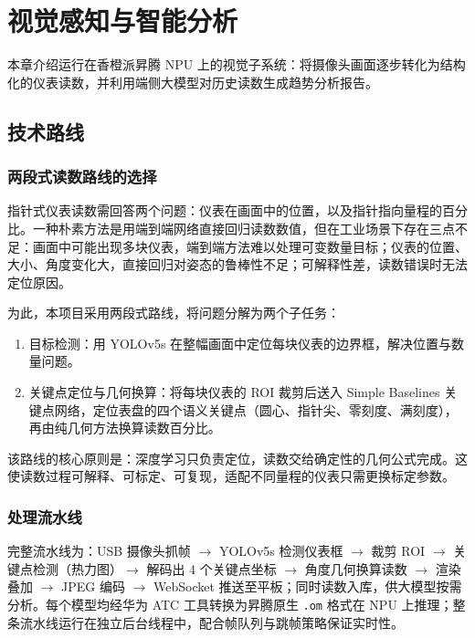\chapter{视觉感知与智能分析}
\label{ch:vision}

本章介绍运行在香橙派昇腾 NPU 上的视觉子系统：将摄像头画面逐步转化为结构化的仪表读数，并利用端侧大模型对历史读数生成趋势分析报告。

\section{技术路线}
\label{sec:vision-overview}

\subsection{两段式读数路线的选择}
\label{sec:two-stage}

指针式仪表读数需回答两个问题：仪表在画面中的位置，以及指针指向量程的百分比。一种朴素方法是用端到端网络直接回归读数数值，但在工业场景下存在三点不足：画面中可能出现多块仪表，端到端方法难以处理可变数量目标；仪表的位置、大小、角度变化大，直接回归对姿态的鲁棒性不足；可解释性差，读数错误时无法定位原因。

为此，本项目采用两段式路线，将问题分解为两个子任务：

\begin{enumerate}
\item 目标检测：用 YOLOv5s 在整幅画面中定位每块仪表的边界框，解决位置与数量问题。
\item 关键点定位与几何换算：将每块仪表的 ROI 裁剪后送入 Simple Baselines 关键点网络，定位表盘的四个语义关键点（圆心、指针尖、零刻度、满刻度），再由纯几何方法换算读数百分比。
\end{enumerate}

该路线的核心原则是：深度学习只负责定位，读数交给确定性的几何公式完成。这使读数过程可解释、可标定、可复现，适配不同量程的仪表只需更换标定参数。

\subsection{处理流水线}
\label{sec:vision-pipeline}

完整流水线为：USB 摄像头抓帧 $\to$ YOLOv5s 检测仪表框 $\to$ 裁剪 ROI $\to$ 关键点检测（热力图）$\to$ 解码出 4 个关键点坐标 $\to$ 角度几何换算读数 $\to$ 渲染叠加 $\to$ JPEG 编码 $\to$ WebSocket 推送至平板；同时读数入库，供大模型按需分析。每个模型均经华为 ATC 工具转换为昇腾原生 \texttt{.om} 格式在 NPU 上推理；整条流水线运行在独立后台线程中，配合帧队列与跳帧策略保证实时性。

